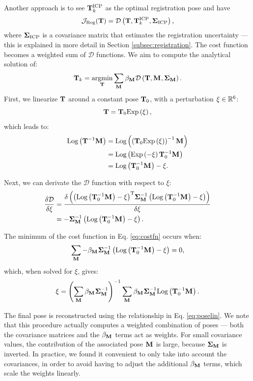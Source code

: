 Another approach is to see $\mathbf{T}_k^{\text{ICP}}$ as the optimal registration pose and have
\begin{equation}
	\mathcal{J}_{\text{Reg}}(\mathbf{T}) = \mathcal{D}\left({\mathbf{T}, \mathbf{T}_k^{\text{ICP}}, \mathbf{\Sigma}_{\text{ICP}}}\right)
	\text{,}
\end{equation}
where $\mathbf{\Sigma}_{\text{ICP}}$ is a covariance matrix that estimates the registration uncertainty --- this is explained in more detail in Section \ref{subsec:registration}. The cost function becomes a weighted sum of $\mathcal{D}$ functions. We aim to compute the analytical solution of:
\newcommand{\betaM}{\beta_{\Mtx{}}}
\begin{equation}
	\label{eq:costfn}
	\pose_k = \underset{\matx{T}}{\text{argmin}}
	\sum_{\Mtx{}} \betaM\dfunc{\pose, \Mtx{}, \CovM}
	\eqdot
\end{equation}
First, we linearize $\mathbf{T}$ around a constant pose $\mathbf{T}_0$, with a perturbation $\xi \in {\mathbb{R}}^6$:
\begin{equation}
	\label{eq:poselin}
	\mathbf{T} = \mathbf{T}_0 \text{Exp}\left({\xi}\right)
	\text{,}
\end{equation}
which leads to:
\begin{align}
	\text{Log}\left({\mathbf{T}^{-1} \mathbf{M}_{}}\right)
	 & = \text{Log}\left({\left(\mathbf{T}_0 \text{Exp}\left({\xi}\right)\right)^{-1} \mathbf{M}_{}}\right) \\
	 & =	\text{Log}\left({\text{Exp}\left({-\xi}\right)\mathbf{T}_0^{-1} \mathbf{M}_{}}\right)               \\
	 & =  \text{Log}\left({\mathbf{T}_0^{-1} \mathbf{M}_{}}\right) - \xi
	\text{.}
\end{align}

Next, we can derivate the $\mathcal{D}$ function with respect to $\xi$:
\begin{align}
	\frac{\delta \mathcal{D}}{\delta\xi}
	 & = \frac{\delta \left({\left(\text{Log}\left({\mathbf{T}_0^{-1} \mathbf{M}_{}}\right) - \xi\right)}^\text{T} \mathbf{\Sigma}_{\mathbf{M}}^{-1} \left(\text{Log}\left({\mathbf{T}_0^{-1} \mathbf{M}_{}}\right) - \xi\right)\right)}{\delta\xi} \\
	 & = -\mathbf{\Sigma}_{\mathbf{M}}^{-1}\left(\text{Log}\left({\mathbf{T}_0^{-1} \mathbf{M}_{}}\right) - \xi\right)
	\text{.}
\end{align}

The minimum of the cost function in Eq. \ref{eq:costfn} occurs when:
\begin{equation}
	\sum_{\Mtx{}} -\betaM \CovM^{-1}\customreslin = 0
	\comma
\end{equation}
which, when solved for $\xi$, gives:
\begin{equation}
	\xi = \left(\sum_{\Mtx{}}\betaM\CovM^{-1}\right)^{-1}
	\sum_{\Mtx{}}\betaM\CovM^{-1}\customreslinnoxi
	\eqdot
\end{equation}

The final pose is reconstructed using the relationship in Eq. \ref{eq:poselin}. We note that this procedure actually computes a weighted combination of poses --- both the covariance matrices and the $\betaM$ terms act as weights. For small covariance values, the contribution of the associated pose $\mathbf{M}_{}$ is large, because $\mathbf{\Sigma}_{\mathbf{M}}$ is inverted. In practice, we found it convenient to only take into account the covariances, in order to avoid having to adjust the additional $\betaM$ terms, which scale the weights linearly.





